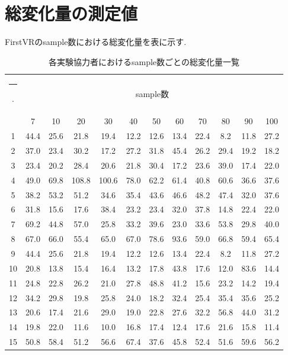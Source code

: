 \documentclass{ltjsreport}
\makeatletter
\def\Hline{
  \noalign{\ifnum0=`}\fi\hrule \@height 3.\arrayrulewidth \futurelet
  \reserved@a\@xhline}
\makeatother
\begin{document}
\section{総変化量の測定値}
FirstVRのsample数における総変化量を表に示す.
		\begin{table}[H]
		\begin{center}
		\caption{各実験協力者におけるsample数ごとの総変化量一覧}
		\label{tab:FVRdata}
		\begin{tabular}{c|ccccccccccc} \Hline
			\multirow{2}{*}{Person}&\multicolumn{11}{c}{sample数}\\
			& 7 & 10 & 20 & 30 & 40 & 50 & 60 & 70 & 80 & 90 & 100 \\ \hline
			1 & 44.4 & 25.6 & 21.8 & 19.4 & 12.2 & 12.6 & 13.4 & 22.4 & 8.2 & 11.8 & 27.2 \\
			2 & 37.0 & 23.4 & 30.2 & 17.2 & 27.2 & 31.8 & 45.4 & 26.2 & 29.4 & 19.2 & 18.2 \\
			3 & 23.4 & 20.2 & 28.4 & 20.6 & 21.8 & 30.4 & 17.2 & 23.6 & 39.0 & 17.4 & 22.0 \\
			4 & 49.0 & 69.8 & 108.8 & 100.6 & 78.0 & 62.2 & 61.4 & 40.8 & 60.6 & 36.6 & 37.6 \\
			5 & 38.2 & 53.2 & 51.2 & 34.6 & 35.4 & 43.6 & 46.6 & 48.2 & 47.4 & 32.0 & 37.6 \\
			6 & 31.8 & 15.6 & 17.6 & 38.4 & 23.2 & 23.4 & 32.0 & 37.8 & 14.8 & 22.4 & 22.0 \\
			7 & 69.2 & 44.8 & 57.0 & 25.8 & 33.2 & 39.6 & 23.0 & 33.6 & 53.8 & 29.8 & 40.0 \\
			8 & 67.0 & 66.0 & 55.4 & 65.0 & 67.0 & 78.6 & 93.6 & 59.0 & 66.8 & 59.4 & 65.4 \\
			9 & 44.4 & 25.6 & 21.8 & 19.4 & 12.2 & 12.6 & 13.4 & 22.4 & 8.2 & 11.8 & 27.2 \\
			10 & 20.8 & 13.8 & 15.4 & 16.4 & 13.2 & 17.8 & 43.8 & 17.6 & 12.0 & 83.6 & 14.4 \\
			11 & 24.8 & 22.8 & 26.2 & 21.0 & 27.8 & 48.8 & 41.2 & 15.6 & 23.2 & 14.2 & 19.4 \\
			12 & 34.2 & 29.8 & 19.8 & 25.8 & 24.0 & 18.2 & 32.4 & 25.4 & 35.4 & 35.6 & 25.2 \\
			13 & 20.6 & 17.4 & 21.6 & 29.0 & 19.0 & 22.8 & 27.6 & 32.2 & 56.8 & 44.0 & 31.2 \\
			14 & 19.8 & 22.0 & 11.6 & 10.0 & 16.8 & 17.4 & 12.4 & 17.6 & 21.6 & 15.8 & 11.4 \\
			15 & 50.8 & 58.4 & 51.2 & 56.6 & 67.4 & 37.6 & 45.8 & 52.4 & 51.6 & 59.6 & 56.2 \\

\end{tabular}
\end{center}
\end{table}
\end{document}
